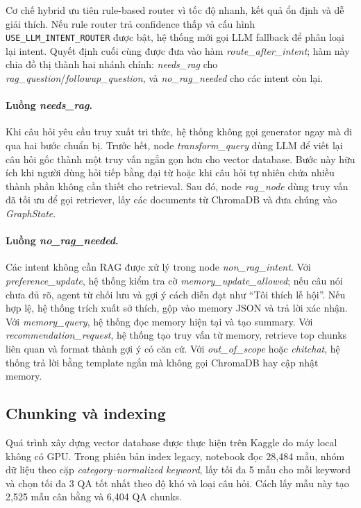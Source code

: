 \documentclass[11pt]{article}
\begin{document}
Cơ chế hybrid ưu tiên rule-based router vì tốc độ nhanh, kết quả ổn định và dễ giải thích. Nếu rule router trả confidence thấp và cấu hình \texttt{USE\_LLM\_INTENT\_ROUTER} được bật, hệ thống mới gọi LLM fallback để phân loại lại intent. Quyết định cuối cùng được đưa vào hàm \textit{route\_after\_intent}; hàm này chia đồ thị thành hai nhánh chính: \textit{needs\_rag} cho \textit{rag\_question}/\textit{followup\_question}, và \textit{no\_rag\_needed} cho các intent còn lại.

\paragraph{Luồng \textit{needs\_rag}.}
Khi câu hỏi yêu cầu truy xuất tri thức, hệ thống không gọi generator ngay mà đi qua hai bước chuẩn bị. Trước hết, node \textit{transform\_query} dùng LLM để viết lại câu hỏi gốc thành một truy vấn ngắn gọn hơn cho vector database. Bước này hữu ích khi người dùng hỏi tiếp bằng đại từ hoặc khi câu hỏi tự nhiên chứa nhiều thành phần không cần thiết cho retrieval. Sau đó, node \textit{rag\_node} dùng truy vấn đã tối ưu để gọi retriever, lấy các documents từ ChromaDB và đưa chúng vào \textit{GraphState}.

\paragraph{Luồng \textit{no\_rag\_needed}.}
Các intent không cần RAG được xử lý trong node \textit{non\_rag\_intent}. Với \textit{preference\_update}, hệ thống kiểm tra cờ \textit{memory\_update\_allowed}; nếu câu nói chưa đủ rõ, agent từ chối lưu và gợi ý cách diễn đạt như ``Tôi thích lễ hội''. Nếu hợp lệ, hệ thống trích xuất sở thích, gộp vào memory JSON và trả lời xác nhận. Với \textit{memory\_query}, hệ thống đọc memory hiện tại và tạo summary. Với \textit{recommendation\_request}, hệ thống tạo truy vấn từ memory, retrieve top chunks liên quan và format thành gợi ý có căn cứ. Với \textit{out\_of\_scope} hoặc \textit{chitchat}, hệ thống trả lời bằng template ngắn mà không gọi ChromaDB hay cập nhật memory.

\subsection{Chunking và indexing}

Quá trình xây dựng vector database được thực hiện trên Kaggle do máy local không có GPU. Trong phiên bản index legacy, notebook đọc 28,484 mẫu, nhóm dữ liệu theo cặp \textit{category}--\textit{normalized keyword}, lấy tối đa 5 mẫu cho mỗi keyword và chọn tối đa 3 QA tốt nhất theo độ khó và loại câu hỏi. Cách lấy mẫu này tạo 2,525 mẫu cân bằng và 6,404 QA chunks.
\end{document}
